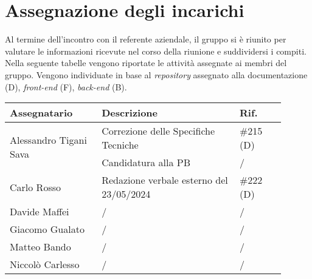 \section{Assegnazione degli incarichi}
Al termine dell'incontro con il referente aziendale, il gruppo si è riunito per valutare le informazioni ricevute nel corso della riunione e suddividersi i compiti.\\
Nella seguente tabelle vengono riportate le attività assegnate ai membri del gruppo.
Vengono individuate in base al \textit{repository} assegnato alla documentazione (D), \textit{front-end} (F), \textit{back-end} (B).

\begin{center}
	{
		\renewcommand{\arraystretch}{1.5}
		\begin{tabular}{p{0.30\linewidth}|p{0.45\linewidth}|p{0.15\linewidth}}
			\textbf{Assegnatario}					& \textbf{Descrizione}						& \textbf{Rif.} \\
			\hline
			\multirow{2}{*}{Alessandro Tigani Sava}	& Correzione delle Specifiche Tecniche		& \#215 (D)		\\
			\cline{2-3}
													& Candidatura alla PB						& /				\\
			\hline
			Carlo Rosso			& Redazione verbale esterno del 23/05/2024	&\#222  (D)		\\
			\hline
			Davide Maffei							& /											& /				\\
			\hline
			Giacomo Gualato							& /											& /				\\
			\hline
			Matteo Bando							& /											& /				\\
			\hline
			Niccolò Carlesso						& /											& /				\\
			\hline
		\end{tabular}
	}
\end{center}

